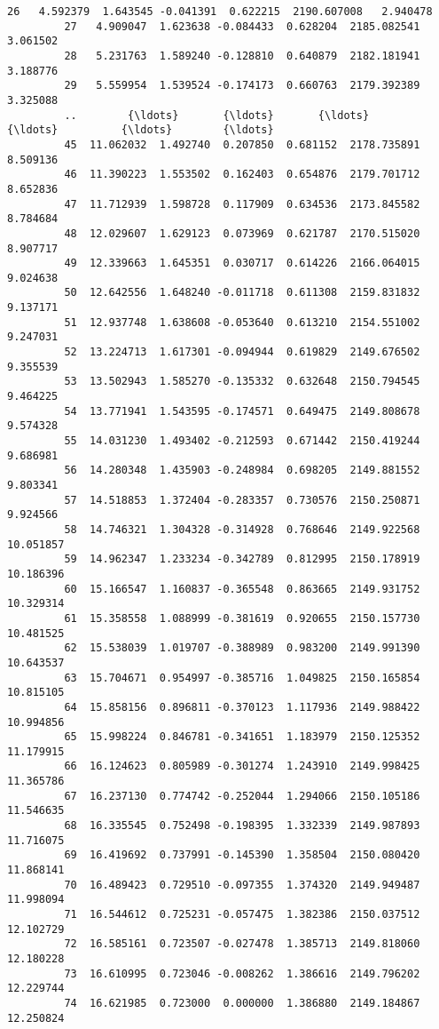 \documentclass[11pt]{article}
\begin{document}
\begin{Verbatim}[commandchars=\\\{\}]
         26   4.592379  1.643545 -0.041391  0.622215  2190.607008   2.940478   
         27   4.909047  1.623638 -0.084433  0.628204  2185.082541   3.061502   
         28   5.231763  1.589240 -0.128810  0.640879  2182.181941   3.188776   
         29   5.559954  1.539524 -0.174173  0.660763  2179.392389   3.325088   
         ..        {\ldots}       {\ldots}       {\ldots}       {\ldots}          {\ldots}        {\ldots}   
         45  11.062032  1.492740  0.207850  0.681152  2178.735891   8.509136   
         46  11.390223  1.553502  0.162403  0.654876  2179.701712   8.652836   
         47  11.712939  1.598728  0.117909  0.634536  2173.845582   8.784684   
         48  12.029607  1.629123  0.073969  0.621787  2170.515020   8.907717   
         49  12.339663  1.645351  0.030717  0.614226  2166.064015   9.024638   
         50  12.642556  1.648240 -0.011718  0.611308  2159.831832   9.137171   
         51  12.937748  1.638608 -0.053640  0.613210  2154.551002   9.247031   
         52  13.224713  1.617301 -0.094944  0.619829  2149.676502   9.355539   
         53  13.502943  1.585270 -0.135332  0.632648  2150.794545   9.464225   
         54  13.771941  1.543595 -0.174571  0.649475  2149.808678   9.574328   
         55  14.031230  1.493402 -0.212593  0.671442  2150.419244   9.686981   
         56  14.280348  1.435903 -0.248984  0.698205  2149.881552   9.803341   
         57  14.518853  1.372404 -0.283357  0.730576  2150.250871   9.924566   
         58  14.746321  1.304328 -0.314928  0.768646  2149.922568  10.051857   
         59  14.962347  1.233234 -0.342789  0.812995  2150.178919  10.186396   
         60  15.166547  1.160837 -0.365548  0.863665  2149.931752  10.329314   
         61  15.358558  1.088999 -0.381619  0.920655  2150.157730  10.481525   
         62  15.538039  1.019707 -0.388989  0.983200  2149.991390  10.643537   
         63  15.704671  0.954997 -0.385716  1.049825  2150.165854  10.815105   
         64  15.858156  0.896811 -0.370123  1.117936  2149.988422  10.994856   
         65  15.998224  0.846781 -0.341651  1.183979  2150.125352  11.179915   
         66  16.124623  0.805989 -0.301274  1.243910  2149.998425  11.365786   
         67  16.237130  0.774742 -0.252044  1.294066  2150.105186  11.546635   
         68  16.335545  0.752498 -0.198395  1.332339  2149.987893  11.716075   
         69  16.419692  0.737991 -0.145390  1.358504  2150.080420  11.868141   
         70  16.489423  0.729510 -0.097355  1.374320  2149.949487  11.998094   
         71  16.544612  0.725231 -0.057475  1.382386  2150.037512  12.102729   
         72  16.585161  0.723507 -0.027478  1.385713  2149.818060  12.180228   
         73  16.610995  0.723046 -0.008262  1.386616  2149.796202  12.229744   
         74  16.621985  0.723000  0.000000  1.386880  2149.184867  12.250824   
         

\end{Verbatim}
\end{document}
